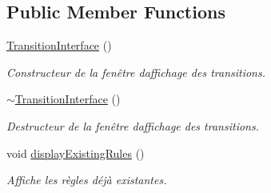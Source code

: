 \subsection*{Public Member Functions}
\begin{DoxyCompactItemize}
\item 
\mbox{\label{class_transition_interface_a69771a30baa5263446b59b423b616725}} 
\mbox{\hyperlink{class_transition_interface_a69771a30baa5263446b59b423b616725}{Transition\+Interface}} ()
\begin{DoxyCompactList}\small\item\em Constructeur de la fenêtre d\textquotesingle{}affichage des transitions. \end{DoxyCompactList}\item 
\mbox{\label{class_transition_interface_a79e9813e9ecab0302ab40b613d351ba3}} 
\mbox{\hyperlink{class_transition_interface_a79e9813e9ecab0302ab40b613d351ba3}{$\sim$\+Transition\+Interface}} ()
\begin{DoxyCompactList}\small\item\em Destructeur de la fenêtre d\textquotesingle{}affichage des transitions. \end{DoxyCompactList}\item 
\mbox{\label{class_transition_interface_a86c426e838754644328b733936719754}} 
void \mbox{\hyperlink{class_transition_interface_a86c426e838754644328b733936719754}{display\+Existing\+Rules}} ()
\begin{DoxyCompactList}\small\item\em Affiche les règles déjà existantes. \end{DoxyCompactList}\end{DoxyCompactItemize}
